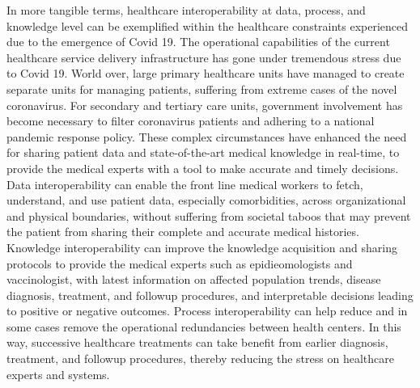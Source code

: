 \documentclass{ieeeaccess}
\begin{document}
In more tangible terms, healthcare interoperability at data, process, and knowledge level can be exemplified within the healthcare constraints experienced due to the emergence of Covid 19. The operational capabilities of the current healthcare service delivery infrastructure has gone under tremendous stress due to Covid 19. World over, large primary healthcare units have managed to create separate units for managing patients, suffering from extreme cases of the novel coronavirus. For secondary and tertiary care units, government involvement has become necessary to filter coronavirus patients and adhering to a national pandemic response policy. 
These complex circumstances have enhanced the need for sharing patient data and state-of-the-art medical knowledge in real-time, to provide the medical experts with a tool to make accurate and timely decisions.
Data interoperability can enable the front line medical workers to fetch, understand, and use patient data, especially comorbidities, across organizational and physical boundaries, without suffering from societal taboos that may prevent the patient from sharing their complete and accurate medical histories. Knowledge interoperability can improve the knowledge acquisition and sharing protocols to provide the medical experts such as epidieomologists and vaccinologist, with latest information on affected population trends, disease diagnosis, treatment, and followup procedures, and interpretable decisions leading to positive or negative outcomes. Process interoperability can help reduce and in some cases remove the operational redundancies between health centers. In this way, successive healthcare treatments can take benefit from earlier diagnosis, treatment, and followup procedures, thereby reducing the stress on healthcare experts and systems. 
\\
\end{document}
